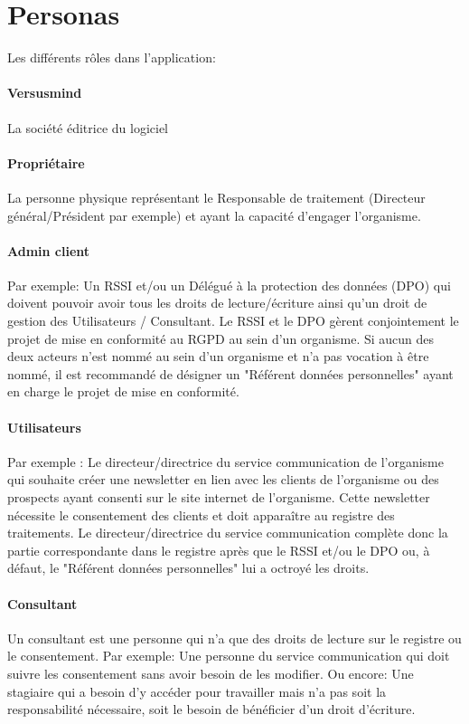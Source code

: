 \documentclass[12pt, a4paper]{report}
\begin{document}
    \chapter{Personas}
        Les différents rôles dans l'application:
        \subsubsection{Versusmind}
            La société éditrice du logiciel
        \subsubsection{Propriétaire}
            La personne physique représentant le Responsable de traitement (Directeur général/Président par exemple) et ayant la capacité d'engager l'organisme.
        \subsubsection{Admin client}
            Par exemple: Un RSSI et/ou un Délégué à la protection des données (DPO) qui doivent pouvoir avoir tous les droits de lecture/écriture ainsi qu'un droit de gestion des Utilisateurs / Consultant.\newline
            Le RSSI et le DPO gèrent conjointement le projet de mise en conformité au RGPD au sein d'un organisme.\newline
            Si aucun des deux acteurs n'est nommé au sein d'un organisme et n'a pas vocation à être nommé, il est recommandé de désigner un "Référent données personnelles" ayant en charge le projet de mise en conformité.
        \newpage
        \subsubsection{Utilisateurs}
            Par exemple : Le directeur/directrice du service communication de l'organisme qui souhaite créer une newsletter en lien avec les clients de l'organisme ou des prospects ayant consenti sur le site internet de l'organisme.\newline
            Cette newsletter nécessite le consentement des clients et doit apparaître au registre des traitements.\newline
            Le directeur/directrice du service communication complète donc la partie correspondante dans le registre après que le RSSI et/ou le DPO ou, à défaut, le "Référent données personnelles" lui a octroyé les droits.
        \subsubsection{Consultant}
            Un consultant est une personne qui n'a que des droits de lecture sur le registre ou le consentement.\newline
            Par exemple: Une personne du service communication qui doit suivre les consentement sans avoir besoin de les modifier.\newline
            Ou encore: Une stagiaire qui a besoin d'y accéder pour travailler mais n'a pas soit la responsabilité nécessaire, soit le besoin de bénéficier d'un droit d'écriture.\newline
\end{document}
